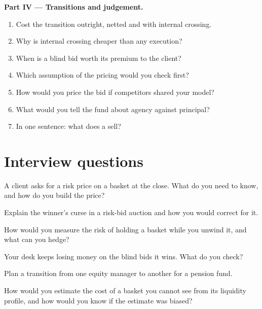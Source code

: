 \begin{problem}
\medskip\noindent\textbf{Part IV --- Transitions and judgement.}
\begin{enumerate}[resume]
\item Cost the transition outright, netted and with internal crossing.
\item Why is internal crossing cheaper than any execution?
\item When is a blind bid worth its premium to the client?
\item Which assumption of the pricing would you check first?
\item How would you price the bid if competitors shared your model?
\item What would you tell the fund about agency against principal?
\item In one sentence: what does a  sell?
\end{enumerate}
\end{problem}

\section{Interview questions}

\begin{interviewq}\label{iq:mx:portfolio-trades-and-risk-bids:1}
A client asks for a risk price on a basket at the close. What do you need to know, and how do you build the price?
\end{interviewq}

\begin{interviewq}\label{iq:mx:portfolio-trades-and-risk-bids:2}
Explain the winner's curse in a risk-bid auction and how you would correct for it.
\end{interviewq}

\begin{interviewq}\label{iq:mx:portfolio-trades-and-risk-bids:3}
How would you measure the risk of holding a basket while you unwind it, and what can you hedge?
\end{interviewq}

\begin{interviewq}\label{iq:mx:portfolio-trades-and-risk-bids:4}
Your desk keeps losing money on the blind bids it wins. What do you check?
\end{interviewq}

\begin{interviewq}\label{iq:mx:portfolio-trades-and-risk-bids:5}
Plan a transition from one equity manager to another for a pension fund.
\end{interviewq}

\begin{interviewq}\label{iq:mx:portfolio-trades-and-risk-bids:6}
How would you estimate the cost of a basket you cannot see from its liquidity profile, and how would you know if the estimate was biased?
\end{interviewq}
